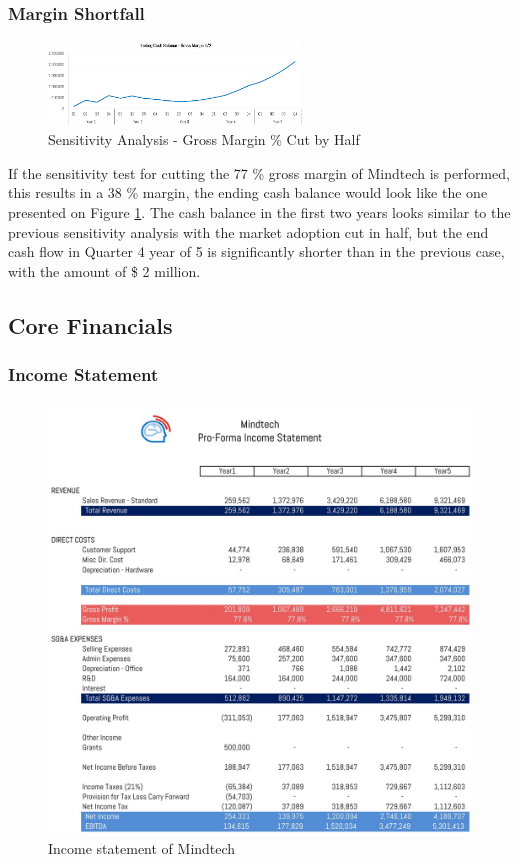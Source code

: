 \documentclass[letterpaper,10pt]{article}
\let\oldsubsection\subsection
\renewcommand{\subsection}{\def\cursectioning{subsection}\oldsubsection}
\begin{document}
\subsubsection{Margin Shortfall}

\begin{figure}
\centering
\includegraphics[width=0.6\textwidth]{grossmarginhalf.PNG}
\caption{Sensitivity Analysis - Gross Margin \% Cut by Half}
\label{img:marginhalf}
\end{figure}

If the sensitivity test for cutting the  77 \% gross margin of Mindtech is performed, this results in a 38 \% margin, the ending cash balance would look like the one presented on Figure \ref{img:marginhalf}. The cash balance in the first two years looks similar to the previous sensitivity analysis with the market adoption cut in half, but the end cash flow in Quarter 4 year of 5 is significantly shorter than in the previous case, with the amount of \$ 2 million.       


\subsection{Core Financials}

\subsubsection{Income Statement}

\begin{figure}[!htb]
\centering
\includegraphics[scale=0.35]{income.jpg}
\caption{Income statement of Mindtech}
\label{img:income}
\end{figure}
\end{document}
